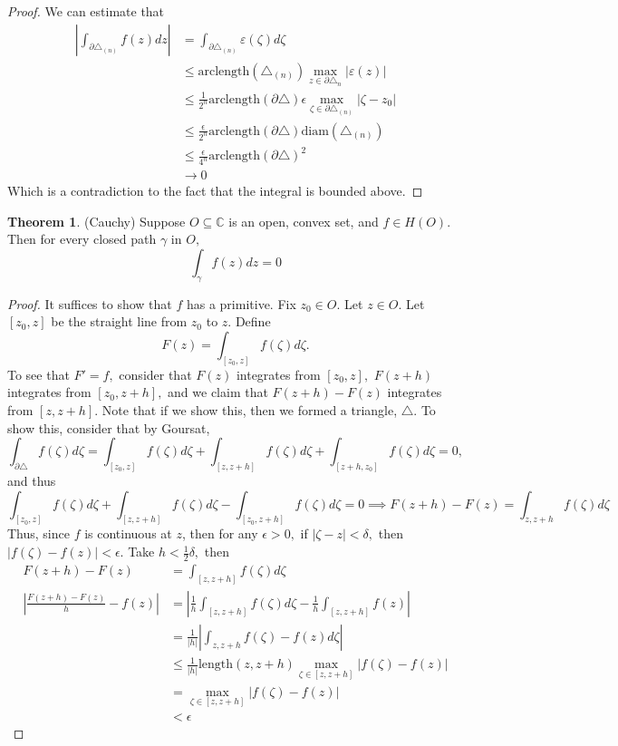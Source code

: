 \documentclass[10pt, oneside]{article}
\newcommand{\bbC}{\mathbb{C}}
\theoremstyle{definition}
\newtheorem{thm}{Theorem}
\begin{document}
\begin{proof}
    
    
    We can estimate that 
    \begin{align*}
    \left|\int_{\partial \triangle_{(n)}}f(z)dz\right| &= \int_{\partial \triangle_{(n)}}\varepsilon(\zeta)d\zeta\\ &\leq \text{arclength}(\triangle_{(n)})\max_{z\in \partial \triangle_n} |\varepsilon(z)|\\ &\leq \frac{1}{2^n}\text{arclength}(\partial \triangle) \epsilon \max_{\zeta \in \partial \triangle_{(n)}}|\zeta - z_0| \\&
    \leq   \frac{\epsilon}{2^n}\text{arclength}(\partial \triangle)  \text{diam}(\triangle_{(n)})\\
    &\leq \frac{\epsilon}{4^n}\text{arclength}(\partial \triangle) ^2\\
    & \to 0
    \end{align*}
     Which is a contradiction to the fact that the integral is bounded above. 
    
\end{proof}

\begin{thm}
    (Cauchy) Suppose $O\subseteq \bbC$ is an open, convex set, and $f\in H(O).$ Then for every closed path $\gamma$ in $O,$ 
    \[\int_\gamma f(z)dz = 0\]
\end{thm}

\begin{proof}
    It suffices to show that $f$ has a primitive. Fix $z_0 \in O.$ Let $z\in O.$ Let $[z_0, z]$ be the straight line from $z_0$ to $z.$ Define
    \[F(z) = \int_{[z_0, z]}f(\zeta)d\zeta.\] To see that $F' = f,$ consider that $F(z)$ integrates from $[z_0, z],$ $F(z + h)$ integrates from $[z_0, z + h],$ and we claim that $F(z + h) - F(z)$ integrates from $[z,z + h].$ Note that if we show this, then we formed a triangle, $\triangle$. To show this, 
    consider that by Goursat,
    \[\int_{\partial \triangle} f(\zeta)d\zeta = \int_{[z_0, z]} f(\zeta)d\zeta + \int_{[z, z + h]} f(\zeta)d\zeta + \int_{[z + h, z_0]} f(\zeta)d\zeta = 0,\] and thus 
    \[\int_{[z_0, z]} f(\zeta)d\zeta + \int_{[z, z + h]} f(\zeta)d\zeta - \int_{[z_0, z + h]} f(\zeta)d\zeta = 0 \implies F(z + h)- F(z)= \int_{z, z + h}f(\zeta)d\zeta\]
    Thus, since $f$ is continuous at $z$, then for any $\epsilon>0,$ if $|\zeta - z|< \delta,$ then $|f(\zeta) - f(z)|< \epsilon.$ Take $h< \frac{1}{2}\delta,$ then 
    \begin{align*}
    F(z + h) - F(z) &= \int_{[z, z + h]}f(\zeta)d\zeta\\
        \left|\frac{F(z + h) - F(z)}{h} - f(z)\right| &= \left|\frac{1}{h}\int_{[z, z + h]}f(\zeta)d\zeta - \frac{1}{h}\int_{[z,z + h]}f(z)\right|\\
        &= \frac{1}{|h|}\left|\int_{z, z + h} f(\zeta) - f(z)d\zeta\right|\\
        &\leq \frac{1}{|h|}\text{length}(z, z + h) \max_{\zeta\in [z, z + h]}|f(\zeta) - f(z)|\\
        &= \max_{\zeta \in [z, z + h]}|f(\zeta) - f(z)|\\
        &< \epsilon
    \end{align*}
\end{proof}
\end{document}
